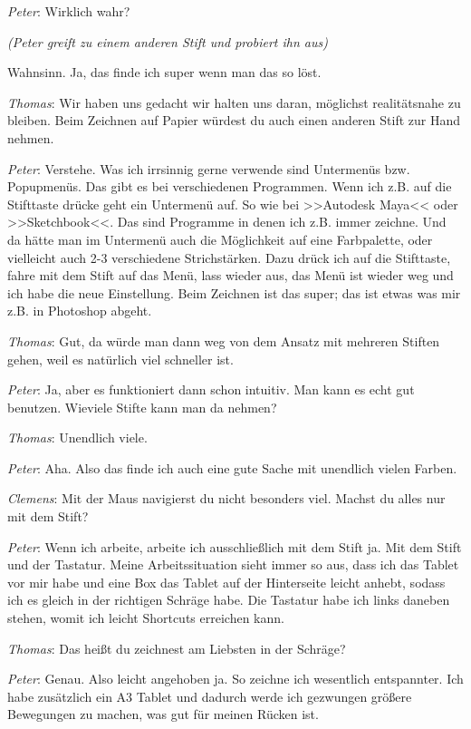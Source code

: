 \medskip \emph{Peter}: Wirklich wahr?

\smallskip \emph{(Peter greift zu einem anderen Stift und probiert ihn aus)}

\smallskip Wahnsinn. Ja, das finde ich super wenn man das so löst.

\medskip \emph{Thomas}: Wir haben uns gedacht wir halten uns daran, möglichst realitätsnahe zu bleiben. Beim Zeichnen auf Papier würdest du auch einen anderen Stift zur Hand nehmen.

\medskip \emph{Peter}: Verstehe. Was ich irrsinnig gerne verwende sind Untermenüs bzw. Popupmenüs. Das gibt es bei verschiedenen Programmen. Wenn ich z.B. auf die Stifttaste drücke geht ein Untermenü auf. So wie bei >>Autodesk Maya<< oder >>Sketchbook<<. Das sind Programme in denen ich z.B. immer zeichne. Und da hätte man im Untermenü auch die Möglichkeit auf eine Farbpalette, oder vielleicht auch 2-3 verschiedene Strichstärken. Dazu drück ich auf die Stifttaste, fahre mit dem Stift auf das Menü, lass wieder aus, das Menü ist wieder weg und ich habe die neue Einstellung. Beim Zeichnen ist das super; das ist etwas was mir z.B. in Photoshop abgeht.

\medskip \emph{Thomas}: Gut, da würde man dann weg von dem Ansatz mit mehreren Stiften gehen, weil es natürlich viel schneller ist.

\medskip \emph{Peter}: Ja, aber es funktioniert dann schon intuitiv. Man kann es echt gut benutzen. Wieviele Stifte kann man da nehmen?

\medskip \emph{Thomas}: Unendlich viele.

\medskip \emph{Peter}: Aha. Also das finde ich auch eine gute Sache mit unendlich vielen Farben.

\medskip \emph{Clemens}: Mit der Maus navigierst du nicht besonders viel. Machst du alles nur mit dem Stift?

\medskip \emph{Peter}: Wenn ich arbeite, arbeite ich ausschließlich mit dem Stift ja. Mit dem Stift und der Tastatur. Meine Arbeitssituation sieht immer so aus, dass ich das Tablet vor mir habe und eine Box das Tablet auf der Hinterseite leicht anhebt, sodass ich es gleich in der richtigen Schräge habe. Die Tastatur habe ich links daneben stehen, womit ich leicht Shortcuts erreichen kann.

\medskip \emph{Thomas}: Das heißt du zeichnest am Liebsten in der Schräge?

\medskip \emph{Peter}: Genau. Also leicht angehoben ja. So zeichne ich wesentlich entspannter. Ich habe zusätzlich ein A3 Tablet und dadurch werde ich gezwungen größere Bewegungen zu machen, was gut für meinen Rücken ist.

